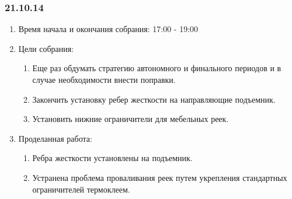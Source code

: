 	
\subsubsection{21.10.14}

\begin{enumerate}
	\item Время начала и окончания собрания:
	17:00 - 19:00
	\item Цели собрания:
	\begin{enumerate}
	  \item Еще раз обдумать стратегию автономного и финального периодов и в случае необходимости внести поправки.
	  
	  \item Закончить установку ребер жесткости на направляющие подъемник.
	  
	  \item Установить нижние ограничители для мебельных реек.
	  
    \end{enumerate}
    
	\item Проделанная работа:
	\begin{enumerate}
	  \item Ребра жесткости установлены на подъемник.
      
      \item Устранена проблема проваливания реек путем укрепления стандартных ограничителей термоклеем.
      

\end{enumerate}
\end{enumerate}

